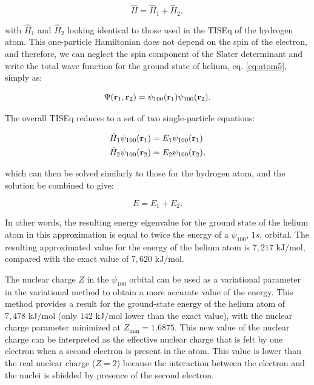 \documentclass[
  9pt,
]{extbook}
\theoremstyle{definition}
\theoremstyle{definition}
\theoremstyle{definition}
\theoremstyle{remark}
\begin{document}
\begin{equation}
\hat{H} =\hat{H}_1+\hat{H}_2,
\label{eq:hf2}
\end{equation}

with \(\hat{H}_1\) and \(\hat{H}_2\) looking identical to those used in the TISEq of the hydrogen atom. This one-particle Hamiltonian does not depend on the spin of the electron, and therefore, we can neglect the spin component of the Slater determinant and write the total wave function for the ground state of helium, eq. \eqref{eq:atom5}, simply as:

\begin{equation}
\Psi({\bf r}_1, {\bf r}_2) = \psi_{100}({\bf r}_1)\psi_{100}({\bf r}_2).
\label{eq:hf3}
\end{equation}

The overall TISEq reduces to a set of two single-particle equations:

\begin{equation}
\begin{aligned}
\hat{H}_1 \psi_{100}({\bf r}_1) &= E_1\psi_{100}({\bf r}_1) \\
\hat{H}_2 \psi_{100}({\bf r}_2) &= E_2\psi_{100}({\bf r}_2),
\end{aligned}
\label{eq:hf4}
\end{equation}

which can then be solved similarly to those for the hydrogen atom, and the solution be combined to give:

\begin{equation}
E = E_1+E_2.
\label{eq:hf5}
\end{equation}

In other words, the resulting energy eigenvalue for the ground state of the helium atom in this approximation is equal to twice the energy of a \(\psi_{100}\), \(1s\), orbital. The resulting approximated value for the energy of the helium atom is \(7,217 \text{ kJ/mol}\), compared with the exact value of \(7,620 \text{ kJ/mol}\).

The nuclear charge \(Z\) in the \(\psi_{100}\) orbital can be used as a variational parameter in the variational method to obtain a more accurate value of the energy. This method provides a result for the ground-state energy of the helium atom of \(7,478 \text{ kJ/mol}\) (only \(142 \text{ kJ/mol}\) lower than the exact value), with the nuclear charge parameter minimized at \(Z_{\text{min}}=1.6875\). This new value of the nuclear charge can be interpreted as the effective nuclear charge that is felt by one electron when a second electron is present in the atom. This value is lower than the real nuclear charge (\(Z=2\)) because the interaction between the electron and the nuclei is shielded by presence of the second electron.
\end{document}

